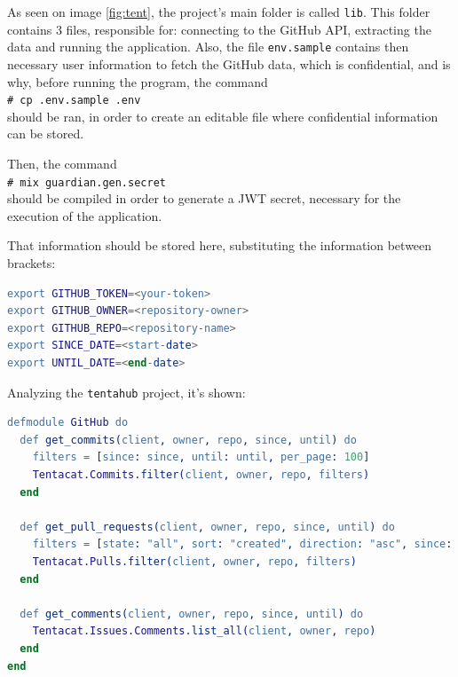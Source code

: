 As seen on image \ref{fig:tent}, the project's main folder is called \texttt{lib}. This folder contains 3 files, responsible for: connecting to the GitHub API, extracting the data and running the application. Also, the file \texttt{env.sample} contains then necessary user information to fetch the GitHub data, which is confidential, and is why, before running the program, the command {
\newcommand{\shellcmd}[1]{\\\indent\indent\texttt{\footnotesize\# #1}\\}
  \shellcmd{cp .env.sample .env}
}should be ran, in order to create an editable file where confidential information can be stored.\newline

Then, the command {
\newcommand{\shellcmd}[1]{\\\indent\indent\texttt{\footnotesize\# #1}\\}
  \shellcmd{mix guardian.gen.secret}
} should be compiled in order to generate a JWT secret, necessary for the execution of the application.\newline

That information should be stored here, substituting the information between brackets:

\begin{lstlisting}[language=Erlang, caption={Setup of.env.sample}]
export GITHUB_TOKEN=<your-token>
export GITHUB_OWNER=<repository-owner>
export GITHUB_REPO=<repository-name>
export SINCE_DATE=<start-date>
export UNTIL_DATE=<end-date>
\end{lstlisting}

Analyzing the \texttt{tentahub} project, it's shown:

\begin{lstlisting}[language=Erlang, caption={Configuration of github.ex}]
    defmodule GitHub do
  def get_commits(client, owner, repo, since, until) do
    filters = [since: since, until: until, per_page: 100]
    Tentacat.Commits.filter(client, owner, repo, filters)
  end

  def get_pull_requests(client, owner, repo, since, until) do
    filters = [state: "all", sort: "created", direction: "asc", since: since, until: until, per_page: 100]
    Tentacat.Pulls.filter(client, owner, repo, filters)
  end

  def get_comments(client, owner, repo, since, until) do
    Tentacat.Issues.Comments.list_all(client, owner, repo)
  end
end
\end{lstlisting} 

